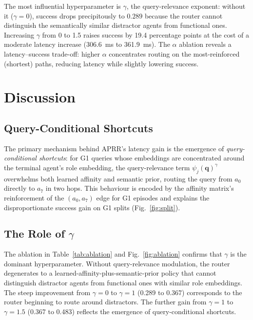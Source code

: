 \documentclass[journal,twocolumn,letterpaper]{IEEEtran}
\newcommand{\APRR}{\textsc{APRR}}
\begin{document}
The most influential hyperparameter is $\gamma$, the query-relevance
exponent: without it ($\gamma=0$), success drops precipitously to $0.289$
because the router cannot distinguish the semantically similar distractor
agents from functional ones.  Increasing $\gamma$ from 0 to 1.5 raises success
by 19.4 percentage points at the cost of a moderate latency increase
(306.6~ms to 361.9~ms).  The $\alpha$ ablation reveals a latency--success
trade-off: higher $\alpha$ concentrates routing on the most-reinforced
(shortest) paths, reducing latency while slightly lowering success.

\section{Discussion}
\label{sec:discussion}

\subsection{Query-Conditional Shortcuts}

The primary mechanism behind \APRR{}'s latency gain is the emergence of
\emph{query-conditional shortcuts}: for G1 queries whose embeddings are
concentrated around the terminal agent's role embedding, the query-relevance
term $\psi_j(\mathbf{q})^\gamma$ overwhelms both learned affinity and semantic
prior, routing the query from $a_0$ directly to $a_7$ in two hops.  This
behaviour is encoded by the affinity matrix's reinforcement of the $(a_0,a_7)$
edge for G1 episodes and explains the disproportionate success gain on G1
splits (Fig.~\ref{fig:split}).

\subsection{The Role of $\gamma$}

The ablation in Table~\ref{tab:ablation} and Fig.~\ref{fig:ablation} confirms
that $\gamma$ is the dominant hyperparameter.  Without query-relevance
modulation, the router degenerates to a learned-affinity-plus-semantic-prior
policy that cannot distinguish distractor agents from functional ones with
similar role embeddings.  The steep improvement from $\gamma{=}0$ to
$\gamma{=}1$ (0.289 to 0.367) corresponds to the router beginning to route
around distractors.  The further gain from $\gamma{=}1$ to $\gamma{=}1.5$
(0.367 to 0.483) reflects the emergence of query-conditional shortcuts.
\end{document}
